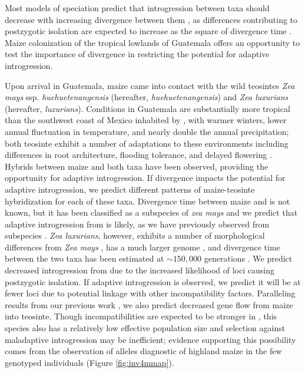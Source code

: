 Most models of speciation predict that introgression between taxa should decrease with increasing divergence between them \citep{harrison2014hybridization}, as differences contributing to postzygotic isolation are expected to increase as the square of divergence time \citep{orr2001evolution}. Maize colonization of the tropical lowlands of Guatemala offers an opportunity to test the importance of divergence in restricting the potential for adaptive introgression.

Upon arrival in Guatemala, maize came into contact with the wild teosintes  \emph{Zea mays} ssp. \emph{huehuetenangensis} (hereafter, \emph{huehuetenangensis}) and \emph{Zea luxurians} (hereafter, \emph{luxurians}). 
Conditions in Guatemala are substantially more tropical than the southwest coast of Mexico inhabited by \zp, with warmer winters, lower annual fluctuation in temperature, and nearly double the annual precipitation; both teosinte exhibit a number of adaptations to these environments including differences in root architecture, flooding tolerance, and delayed flowering \citep{wilkes1967teosinte, mano2006}.
Hybrids between maize and both taxa \citep{wilkes1967teosinte} have been observed, providing the opportunity for adaptive introgression.  
If divergence impacts the potential for adaptive introgression, we predict different patterns of maize-teosinte hybridization for each of these taxa. 
Divergence time between maize and \zh{} is not known, but it has been classified as a subspecies of \emph{zea mays} \citep{doebley1990systematics} and we predict that adaptive introgression from \zh{} is likely, as we have previously observed from subspecies \zm{} \citep{Hufford2013}.
\emph{Zea luxurians}, however, exhibits a number of morphological differences from \emph{Zea mays} \citep{doebley1980taxonomy}, has a much larger genome \citep{tenaillon2011genome}, and divergence time between the two taxa has been estimated at $\sim150,000$ generations \citep{Ross-Ibarra2009a}. 
We predict decreased introgression from \zl{} due to the increased likelihood of loci causing postzygotic isolation.  
If adaptive introgression is observed, we predict it will be at fewer loci due to potential linkage with other incompatibility factors. 
Paralleling results from our previous work \citep{Hufford2013}, we also predict decreased gene flow from maize into teosinte. 
Though incompatibilities are expected to be stronger in \zl{}, this species also has a relatively low effective population size and selection against maladaptive introgression may be inefficient; evidence supporting this possibility comes from the observation of alleles diagnostic of highland maize in the few genotyped \zl{} individuals (Figure \ref{fig:inv4mmap}). 

